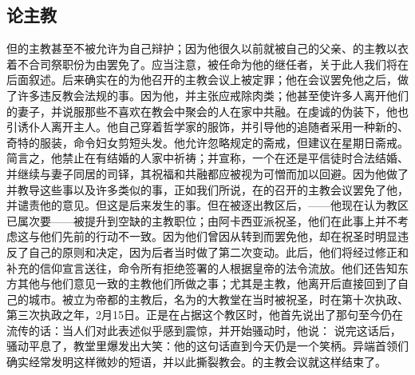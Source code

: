 \subsection{论主教}

但的主教甚至不被允许为自己辩护；因为他很久以前就被自己的父亲、的主教以衣着不合司祭职份为由罢免了。应当注意，被任命为他的继任者，关于此人我们将在后面叙述。后来确实在的为他召开的主教会议上被定罪；他在会议罢免他之后，做了许多违反教会法规的事。因为他，并主张应戒除肉类；他甚至使许多人离开他们的妻子，并说服那些不喜欢在教会中聚会的人在家中共融。在虔诚的伪装下，他也引诱仆人离开主人。他自己穿着哲学家的服饰，并引导他的追随者采用一种新的、奇特的服装，命令妇女剪短头发。他允许忽略规定的斋戒，但建议在星期日斋戒。简言之，他禁止在有结婚的人家中祈祷；并宣称，一个在还是平信徒时合法结婚、并继续与妻子同居的司铎，其祝福和共融都应被视为可憎而加以回避。因为他做了并教导这些事以及许多类似的事，正如我们所说，在的召开的主教会议罢免了他，并谴责他的意见。但这是后来发生的事。但在被逐出教区后，——他现在认为教区已属次要——被提升到空缺的主教职位；由阿卡西亚派祝圣，他们在此事上并不考虑这与他们先前的行动不一致。因为他们曾因从转到而罢免他，却在祝圣时明显违反了自己的原则和决定，因为后者当时做了第二次变动。此后，他们将经过修正和补充的信仰宣言送往，命令所有拒绝签署的人根据皇帝的法令流放。他们还告知东方其他与他们意见一致的主教他们所做之事；尤其是主教，他离开后直接回到了自己的城市。被立为帝都的主教后，名为的大教堂在当时被祝圣，时在第十次执政、第三次执政之年，2月15日。正是在占据这个教区时，他首先说出了那句至今仍在流传的话：当人们对此表述似乎感到震惊，并开始骚动时，他说： 说完这话后，骚动平息了，教堂里爆发出大笑：他的这句话直到今天仍是一个笑柄。异端首领们确实经常发明这样微妙的短语，并以此撕裂教会。的主教会议就这样结束了。\par



